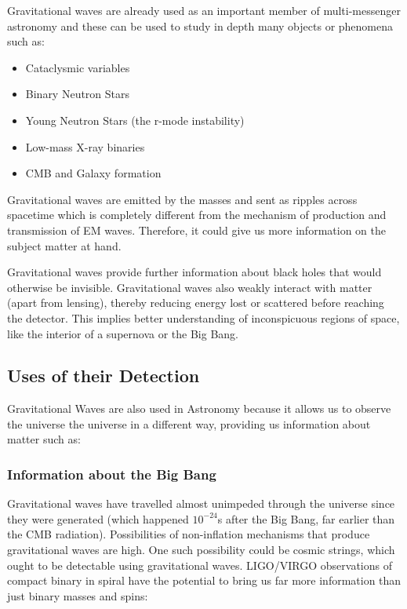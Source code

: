 \hspace{1cm}Gravitational waves are already used as an important member of multi-messenger astronomy and these can be used to study in depth many objects or phenomena such as:

\begin{itemize}

\item Cataclysmic variables
\item Binary Neutron Stars
\item Young Neutron Stars (the r-mode instability)
\item Low-mass X-ray binaries
\item CMB and Galaxy formation

\end{itemize}

\hspace{1cm}Gravitational waves are emitted by the masses and sent as ripples across spacetime which is completely different from the mechanism of production and transmission of EM waves. Therefore, it could give us more information on the subject matter at hand.

\hspace{1cm}Gravitational waves provide further information about black holes that would otherwise be invisible. Gravitational waves also weakly interact with matter (apart from lensing), thereby reducing energy lost or scattered before reaching the detector. This implies better understanding of inconspicuous regions of space, like the interior of a supernova or the Big Bang.

\subsection{Uses of their Detection}

\hspace{1cm} Gravitational Waves are also used in Astronomy because it allows us to observe the universe the universe in a different way, providing us information about matter such as:

\subsubsection*{Information about the Big Bang}
\hspace{1cm}Gravitational waves have travelled almost unimpeded through the universe since they were generated (which happened $10^{-24}$s after the Big Bang, far earlier than the CMB radiation). Possibilities of non-inflation mechanisms that produce gravitational waves are high. One such possibility could be cosmic strings, which ought to be detectable using gravitational waves. LIGO/VIRGO observations of compact binary in spiral have the potential to bring us far more information than just binary masses and spins:

